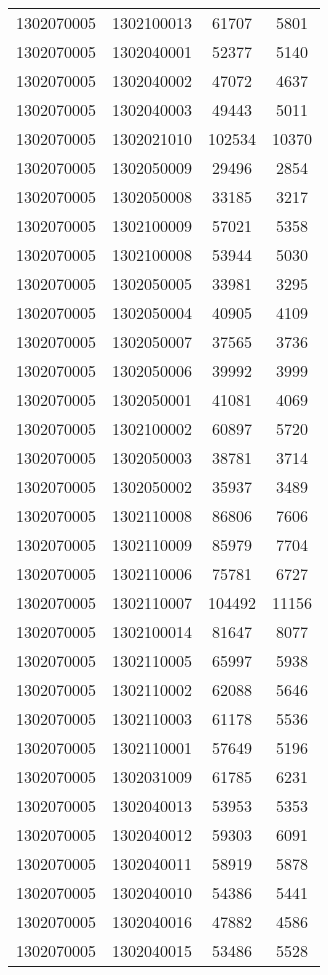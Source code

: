 \begin{longtable}{llcc}
1302070005 & 1302100013 & 61707 & 5801\\
1302070005 & 1302040001 & 52377 & 5140\\
1302070005 & 1302040002 & 47072 & 4637\\
1302070005 & 1302040003 & 49443 & 5011\\
1302070005 & 1302021010 & 102534 & 10370\\
1302070005 & 1302050009 & 29496 & 2854\\
1302070005 & 1302050008 & 33185 & 3217\\
1302070005 & 1302100009 & 57021 & 5358\\
1302070005 & 1302100008 & 53944 & 5030\\
1302070005 & 1302050005 & 33981 & 3295\\
1302070005 & 1302050004 & 40905 & 4109\\
1302070005 & 1302050007 & 37565 & 3736\\
1302070005 & 1302050006 & 39992 & 3999\\
1302070005 & 1302050001 & 41081 & 4069\\
1302070005 & 1302100002 & 60897 & 5720\\
1302070005 & 1302050003 & 38781 & 3714\\
1302070005 & 1302050002 & 35937 & 3489\\
1302070005 & 1302110008 & 86806 & 7606\\
1302070005 & 1302110009 & 85979 & 7704\\
1302070005 & 1302110006 & 75781 & 6727\\
1302070005 & 1302110007 & 104492 & 11156\\
1302070005 & 1302100014 & 81647 & 8077\\
1302070005 & 1302110005 & 65997 & 5938\\
1302070005 & 1302110002 & 62088 & 5646\\
1302070005 & 1302110003 & 61178 & 5536\\
1302070005 & 1302110001 & 57649 & 5196\\
1302070005 & 1302031009 & 61785 & 6231\\
1302070005 & 1302040013 & 53953 & 5353\\
1302070005 & 1302040012 & 59303 & 6091\\
1302070005 & 1302040011 & 58919 & 5878\\
1302070005 & 1302040010 & 54386 & 5441\\
1302070005 & 1302040016 & 47882 & 4586\\
1302070005 & 1302040015 & 53486 & 5528\\

\end{longtable}
